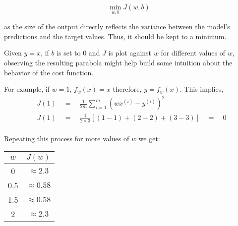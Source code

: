 \documentclass{article}
\begin{document}
\[\min_{w, b}J(w, b)\]

\noindent as the size of the output directly reflects the variance between the model's predictions and the target values. Thus, it should be kept to a minimum. 

Given $y = x$, if $b$ is set to 0 and $J$ is plot against $w$ for different values of $w$, observing the resulting parabola might help build some intuition about the behavior of the cost function.

\noindent For example, if $w = 1$, $f_{w}(x) = x$ therefore, $y = f_{w}(x)$. This implies,
\begin{align*}
&J(1) \quad=\quad \frac{1}{2m}\sum^m_{i=1}{ (wx^{(i)} - y^{(i)})^2 } \\
&J(1) \quad=\quad \frac{1}{2\times3}[(1-1) + (2-2) + (3-3)] \quad=\quad 0 \\
\end{align*}

\noindent Repeating this process for more values of $w$ we get:

\begin{center}
\centering
\begin{tabular}{|c|c|}
\hline
\textbf{$w$} & \textbf{$J(w)$} \\
\hline
0 & $\approx 2.3$ \\
\hline
0.5 & $\approx 0.58$ \\
\hline
1.5 & $\approx 0.58$ \\
\hline
2 & $\approx 2.3$ \\
\hline
\end{tabular}
\end{center}

\end{document}
